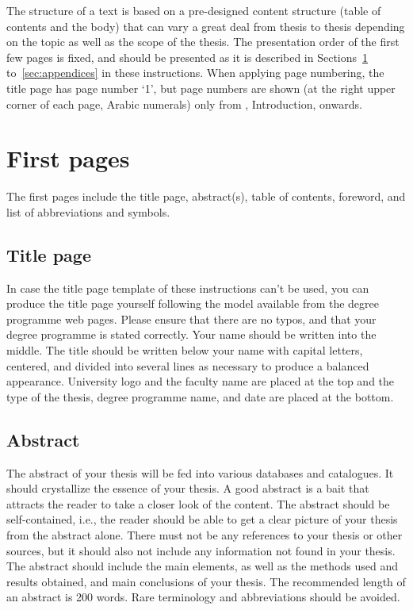 
The structure of a text is based on a pre-designed content structure (table of contents and the body) that can vary a great deal from thesis to thesis depending on the topic as well as the scope of the thesis. The presentation order of the first few pages is fixed, and should be presented as it is described in Sections~\ref{sec:first_pages} to~\ref{sec:appendices} in these instructions. When applying page numbering, the title page has page number ‘1’, but page numbers are shown (at the right upper corner of each page, Arabic numerals) only from , Introduction, onwards.

\section{First pages}
\label{sec:first_pages}
The first pages include the title page, abstract(s), table of contents, foreword, and list of abbreviations and symbols. 

\subsection{Title page}

In case the title page template of these instructions can't be used, you can produce the title page yourself following the model available from the degree programme web pages. Please ensure that there are no typos, and that your degree programme is stated correctly. Your name should be written into the middle. The title should be written below your name with capital letters, centered, and divided into several lines as necessary to produce a balanced appearance. University logo and the faculty name are placed at the top and the type of the thesis, degree programme name, and date are placed at the bottom.

\subsection{Abstract}

The abstract of your thesis will be fed into various databases and catalogues. It should crystallize the essence of your thesis. A good abstract is a bait that attracts the reader to take a closer look of the content. The abstract should be self-contained, i.e., the reader should be able to get a clear picture of your thesis from the abstract alone. There must not be any references to your thesis or other sources, but it should also not include any information not found in your thesis. The abstract should include the main elements, as well as the methods used and results obtained, and main conclusions of your thesis. The recommended length of an abstract is 200 words. Rare terminology and abbreviations should be avoided. 

